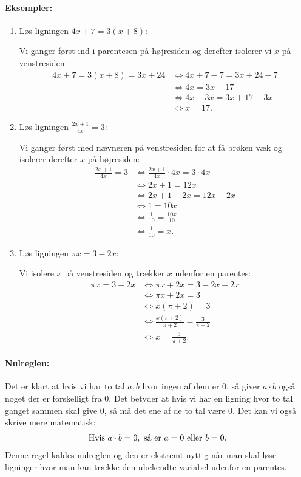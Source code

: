 \paragraph*{Eksempler:}
\begin{enumerate}
\item Løs ligningen $4x+7 = 3(x+8)$:

Vi ganger først ind i parentesen på højresiden og derefter isolerer vi $x$ på venstresiden:
\begin{align*}
4x+7=3(x+8)= 3x+24 &\Leftrightarrow 4x+7-7 = 3x+24-7 \\
&\Leftrightarrow 4x = 3x + 17 \\
&\Leftrightarrow 4x - 3x = 3x + 17 - 3x \\
&\Leftrightarrow x = 17.
\end{align*}
\item Løs ligningen $\frac{2x+1}{4x}=3$:

Vi ganger først med nævneren på venstresiden for at få brøken væk og isolerer derefter $x$ på højresiden:
\begin{align*}
\frac{2x+1}{4x}=3 &\Leftrightarrow \frac{2x+1}{4x} \cdot 4x = 3 \cdot 4x \\
&\Leftrightarrow 2x+1 = 12x \\
&\Leftrightarrow 2x +1 - 2x = 12x - 2x \\
&\Leftrightarrow 1 = 10x\\
&\Leftrightarrow \frac{1}{10} = \frac{10x}{10} \\
&\Leftrightarrow \frac{1}{10} = x. 
\end{align*}
\item Løs ligningen $\pi x = 3-2x$:

Vi isolere $x$ på venstresiden og trækker $x$ udenfor en parentes:
\begin{align*}
\pi x = 3-2x &\Leftrightarrow \pi x +2x = 3 - 2x + 2x \\
&\Leftrightarrow \pi x + 2x = 3 \\
&\Leftrightarrow x(\pi+2) = 3 \\
&\Leftrightarrow \frac{x(\pi + 2)}{\pi + 2} = \frac{3}{\pi +2} \\
&\Leftrightarrow x = \frac{3 }{\pi +2}.
\end{align*}
\end{enumerate}

\paragraph*{Nulreglen:}
Det er klart at hvis vi har to tal $a,b$ hvor ingen af dem er $0$, så giver $a \cdot b$ også noget der er forskelligt fra $0$. Det betyder at hvis vi har en ligning hvor to tal ganget sammen skal give $0$, så må det ene af de to tal være $0$. Det kan vi også skrive mere matematisk:
\begin{align*}
\textup{Hvis }a \cdot b = 0, \textup{ så er } a=0 \textup{ eller } b=0.
\end{align*}
Denne regel kaldes nulreglen og den er ekstremt nyttig når man skal løse ligninger hvor man kan trække den ubekendte variabel udenfor en parentes.


